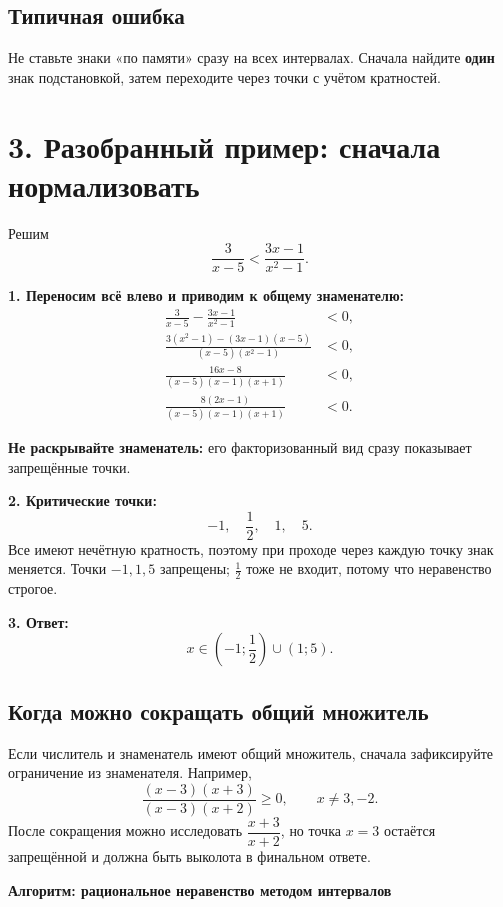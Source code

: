 \documentclass[a4paper,12pt]{article}
\newcommand{\important}[1]{\textcolor{darkaccent}{\textbf{#1}}}
\begin{document}
\subsection*{Типичная ошибка}
Не ставьте знаки «по памяти» сразу на всех интервалах. Сначала найдите \textbf{один} знак подстановкой, затем переходите через точки с учётом кратностей.

\section*{3. Разобранный пример: сначала нормализовать}
Решим
\[
\frac{3}{x-5}<\frac{3x-1}{x^2-1}.
\]

\textbf{1. Переносим всё влево и приводим к общему знаменателю:}
\begin{align*}
\frac{3}{x-5}-\frac{3x-1}{x^2-1}&<0,\\
\frac{3(x^2-1)-(3x-1)(x-5)}{(x-5)(x^2-1)}&<0,\\
\frac{16x-8}{(x-5)(x-1)(x+1)}&<0,\\
\frac{8(2x-1)}{(x-5)(x-1)(x+1)}&<0.
\end{align*}

\important{Не раскрывайте знаменатель:} его факторизованный вид сразу показывает запрещённые точки.

\textbf{2. Критические точки:}
\[
-1,\quad \frac12,\quad 1,\quad 5.
\]
Все имеют нечётную кратность, поэтому при проходе через каждую точку знак меняется. Точки \(-1,1,5\) запрещены; \(\frac12\) тоже не входит, потому что неравенство строгое.

\textbf{3. Ответ:}
\[
\boxed{x\in\left(-1;\frac12\right)\cup(1;5)}.
\]

\subsection*{Когда можно сокращать общий множитель}
Если числитель и знаменатель имеют общий множитель, сначала зафиксируйте ограничение из знаменателя.
Например,
\[
\frac{(x-3)(x+3)}{(x-3)(x+2)}\ge0,\qquad x\ne3,-2.
\]
После сокращения можно исследовать \(\dfrac{x+3}{x+2}\), но точка \(x=3\) остаётся запрещённой и должна быть выколота в финальном ответе.

\clearpage

\thispagestyle{fancy}
\begin{center}
{\LARGE\bfseries\color{darkaccent} Алгоритм: рациональное неравенство методом интервалов}
\end{center}
\vspace{5mm}
\end{document}
